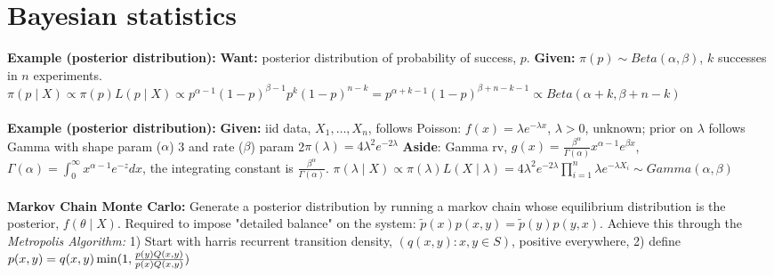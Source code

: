 \documentclass[9pt]{extarticle}
\begin{document}
\section{Bayesian statistics}
\textbf{Example (posterior distribution):} \textbf{Want:} posterior distribution of probability of success, $p$. \textbf{Given:} $\pi(p) \sim Beta(\alpha, \beta)$, $k$ successes in $n$ experiments. $\pi(p \mid X) \propto \pi(p)L(p \mid X) \propto p^{\alpha-1}(1-p)^{\beta - 1}p^k(1-p)^{n-k} = p^{\alpha + k - 1}(1-p)^{\beta + n - k - 1} \propto Beta(\alpha + k, \beta + n - k)$\\\\
\textbf{Example (posterior distribution):} \textbf{Given:} iid data, $X_1, \dots, X_n$, follows Poisson: $f(x) = \lambda e^{-\lambda x}$, $\lambda > 0$, unknown; prior on $\lambda$ follows Gamma with shape param ($\alpha$) 3 and rate ($\beta$) param 2$\pi(\lambda) = 4\lambda^2e^{-2\lambda}$ \textbf{Aside}: Gamma rv, $g(x) = \frac{\beta^\alpha}{\Gamma(\alpha)}x^{\alpha-1}e^{\beta x}$, $\Gamma(\alpha) = \int_0^\infty x^{\alpha-1}e^{-z}dx$, the integrating constant is $\frac{\beta^\alpha}{\Gamma(\alpha)}$. $\pi(\lambda \mid X) \propto \pi(\lambda) L(X \mid \lambda) = 4\lambda^2e^{-2\lambda} \prod_{i=1}^n \lambda e^{-\lambda X_i}  \sim Gamma(\alpha, \beta)$\\\\
\textbf{Markov Chain Monte Carlo:} Generate a posterior distribution by running a markov chain whose equilibrium distribution is the posterior, $f(\theta \mid X)$. Required to impose "detailed balance" on the system: $\tilde{p}(x)p(x,y) = \tilde{p}(y)p(y,x)$. Achieve this through the \textit{Metropolis Algorithm:} 1) Start with harris recurrent transition density, $(q(x,y): x,y \in S)$, positive everywhere, 2) define $p(x,y) = q(x,y) \min\large (1, \frac{p(y)Q(x,y)}{p(x)Q(x,y)} \large )$
\end{document}
